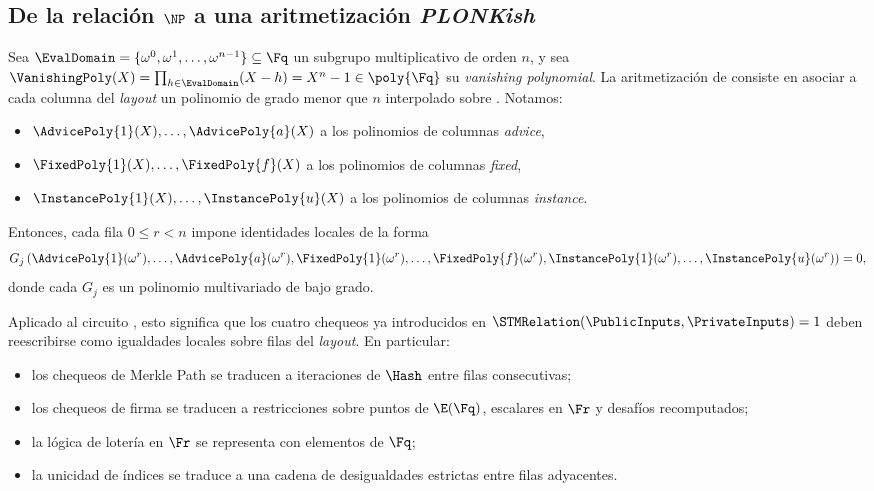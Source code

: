 
\subsection{De la relación \texorpdfstring{\(\NP\)}{NP} a una aritmetización \textit{PLONKish}}

Sea $\EvalDomain = \{\omega^0,\omega^1,\ldots,\omega^{n-1}\} \subseteq \Fq$ un subgrupo multiplicativo de orden $n$, y sea $\VanishingPoly(X) = \prod_{h \in \EvalDomain} (X - h) = X^n - 1 \in \poly{\Fq}$ su \textit{vanishing polynomial}. La aritmetización de \HaloTwo consiste en asociar a cada columna del \textit{layout} un polinomio de grado menor que $n$ interpolado sobre \EvalDomain. Notamos:
\begin{itemize}[noitemsep]
	\item $\AdvicePoly{1}(X), \ldots, \AdvicePoly{a}(X)$ a los polinomios de columnas \textit{advice},
	\item $\FixedPoly{1}(X), \ldots, \FixedPoly{f}(X)$ a los polinomios de columnas \textit{fixed},
	\item $\InstancePoly{1}(X), \ldots, \InstancePoly{u}(X)$ a los polinomios de columnas \textit{instance}.
\end{itemize}

Entonces, cada fila $0 \leq r < n$ impone identidades locales de la forma
$$G_j \left(\AdvicePoly{1}(\omega^r), \ldots, \AdvicePoly{a}(\omega^r), \FixedPoly{1}(\omega^r), \ldots, \FixedPoly{f}(\omega^r), \InstancePoly{1}(\omega^r), \ldots, \InstancePoly{u}(\omega^r)\right) = 0,$$
donde cada $G_j$ es un polinomio multivariado de bajo grado.

Aplicado al circuito \STM, esto significa que los cuatro chequeos ya introducidos en $\STMRelation(\PublicInputs, \PrivateInputs) = 1$ deben reescribirse como igualdades locales sobre filas del \textit{layout}. En particular:
\begin{itemize}[noitemsep]
    \item los chequeos de Merkle Path se traducen a iteraciones de $\Hash$ entre filas consecutivas;
    \item los chequeos de firma se traducen a restricciones sobre puntos de $\E(\Fq)$, escalares en $\Fr$ y desafíos recomputados;
    \item la lógica de lotería en $\Fr$ se representa con elementos de $\Fq$;
    \item la unicidad de índices se traduce a una cadena de desigualdades estrictas entre filas adyacentes.
\end{itemize}

